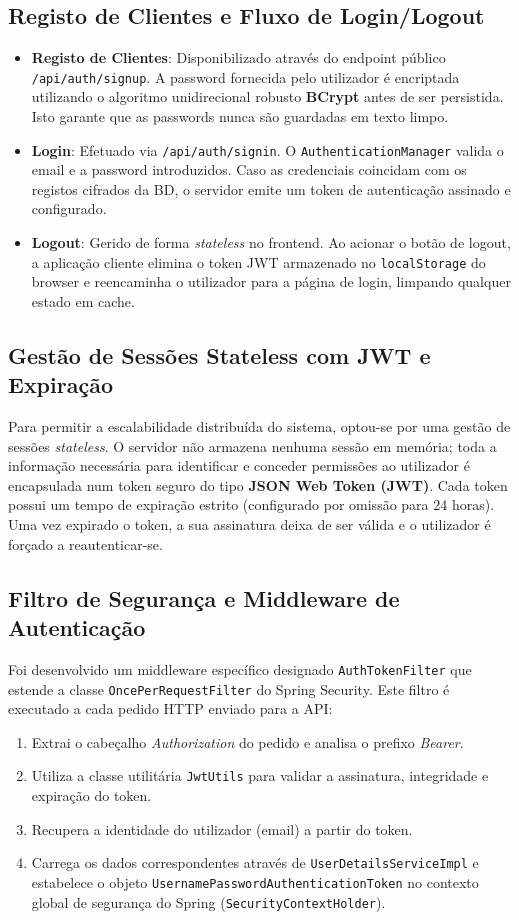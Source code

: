 \documentclass[11pt,a4paper,oneside]{report}
\begin{document}
\subsection{Registo de Clientes e Fluxo de Login/Logout}
\begin{itemize}
    \item \textbf{Registo de Clientes}: Disponibilizado através do endpoint público \texttt{/api/auth/signup}. A password fornecida pelo utilizador é encriptada utilizando o algoritmo unidirecional robusto \textbf{BCrypt} antes de ser persistida. Isto garante que as passwords nunca são guardadas em texto limpo.
    \item \textbf{Login}: Efetuado via \texttt{/api/auth/signin}. O \texttt{AuthenticationManager} valida o email e a password introduzidos. Caso as credenciais coincidam com os registos cifrados da BD, o servidor emite um token de autenticação assinado e configurado.
    \item \textbf{Logout}: Gerido de forma \textit{stateless} no frontend. Ao acionar o botão de logout, a aplicação cliente elimina o token JWT armazenado no \texttt{localStorage} do browser e reencaminha o utilizador para a página de login, limpando qualquer estado em cache.
\end{itemize}

\subsection{Gestão de Sessões Stateless com JWT e Expiração}
Para permitir a escalabilidade distribuída do sistema, optou-se por uma gestão de sessões \textit{stateless}. O servidor não armazena nenhuma sessão em memória; toda a informação necessária para identificar e conceder permissões ao utilizador é encapsulada num token seguro do tipo \textbf{JSON Web Token (JWT)}.
Cada token possui um tempo de expiração estrito (configurado por omissão para 24 horas). Uma vez expirado o token, a sua assinatura deixa de ser válida e o utilizador é forçado a reautenticar-se.

\subsection{Filtro de Segurança e Middleware de Autenticação}
Foi desenvolvido um middleware específico designado \texttt{AuthTokenFilter} que estende a classe \texttt{OncePerRequestFilter} do Spring Security. Este filtro é executado a cada pedido HTTP enviado para a API:
\begin{enumerate}
    \item Extrai o cabeçalho \textit{Authorization} do pedido e analisa o prefixo \textit{Bearer}.
    \item Utiliza a classe utilitária \texttt{JwtUtils} para validar a assinatura, integridade e expiração do token.
    \item Recupera a identidade do utilizador (email) a partir do token.
    \item Carrega os dados correspondentes através de \texttt{UserDetailsServiceImpl} e estabelece o objeto \texttt{UsernamePasswordAuthenticationToken} no contexto global de segurança do Spring (\texttt{SecurityContextHolder}).
\end{enumerate}
\end{document}
